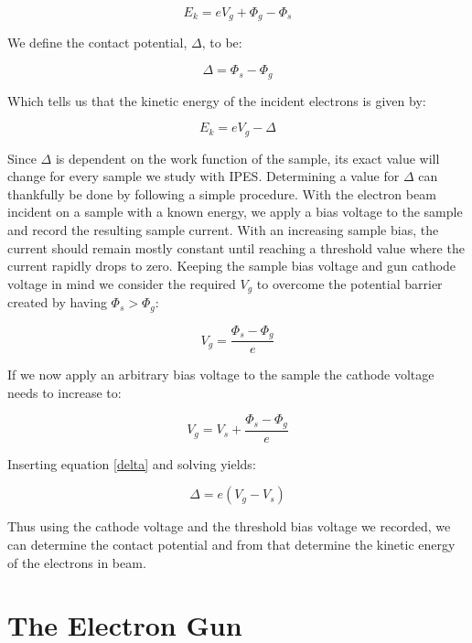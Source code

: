 \begin{equation}
  E_k = eV_g + \Phi_g - \Phi_s
\end{equation}

We define the contact potential, $\Delta$, to be:

\begin{equation}\label{delta}
  \Delta = \Phi_s - \Phi_g
\end{equation}

Which tells us that the kinetic energy of the incident electrons is given by:

\begin{equation}\label{Ek}
  E_k = eV_g - \Delta
\end{equation}

Since $\Delta$ is dependent on the work function of the sample, its exact value will change for every sample we study with IPES. Determining a value for $\Delta$ can thankfully be
done by following a simple procedure\cite{mcmahon_2012}. With the electron beam incident on a sample with a known energy, we apply a bias voltage to the sample and record the 
resulting sample current. With an increasing sample bias, the current should remain mostly constant until reaching a threshold value where the current rapidly drops to zero. Keeping 
the sample bias voltage and gun cathode voltage in mind we consider the required $V_g$ to overcome the potential barrier created by having $\Phi_s > \Phi_g$:

\begin{equation}
  V_g = \frac{\Phi_s - \Phi_g}{e}
\end{equation}

If we now apply an arbitrary bias voltage to the sample the cathode voltage needs to increase to:

\begin{equation}
  V_g = V_s + \frac{\Phi_s - \Phi_g}{e}
\end{equation}

Inserting equation \eqref{delta} and solving yields:

\begin{equation}\label{vgvs}
  \Delta = e(V_g - V_s)
\end{equation}

Thus using the cathode voltage and the threshold bias voltage we recorded, we can determine the contact potential and from that determine the kinetic energy of the electrons in beam.

\section{The Electron Gun}

